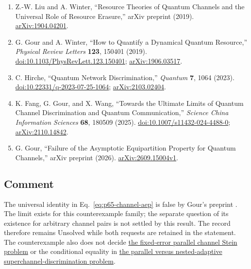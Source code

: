 \begin{enumerate}[label={},leftmargin=4.8em,labelsep=0.5em]
  \footnotesize
  \item[\textup{[LW19]}]\label{ref:p65-liu-winter}
  Z.-W. Liu and A. Winter,
  ``Resource Theories of Quantum Channels and the Universal Role of Resource
  Erasure,'' arXiv preprint (2019).
  \href{https://arxiv.org/abs/1904.04201}{arXiv:1904.04201}.

  \item[\textup{[GW19]}]\label{ref:p65-gour-winter}
  G. Gour and A. Winter, ``How to Quantify a Dynamical Quantum Resource,''
  \emph{Physical Review Letters} \textbf{123}, 150401 (2019).
  \href{https://doi.org/10.1103/PhysRevLett.123.150401}{doi:10.1103/PhysRevLett.123.150401};
  \href{https://arxiv.org/abs/1906.03517}{arXiv:1906.03517}.

  \item[\textup{[Hir23]}]\label{ref:p65-hirche}
  C. Hirche, ``Quantum Network Discrimination,''
  \emph{Quantum} \textbf{7}, 1064 (2023).
  \href{https://doi.org/10.22331/q-2023-07-25-1064}{doi:10.22331/q-2023-07-25-1064};
  \href{https://arxiv.org/abs/2103.02404}{arXiv:2103.02404}.

  \item[\textup{[FGW25]}]\label{ref:p65-fang-gour-wang}
  K. Fang, G. Gour, and X. Wang,
  ``Towards the Ultimate Limits of Quantum Channel Discrimination and Quantum
  Communication,'' \emph{Science China Information Sciences} \textbf{68},
  180509 (2025).
  \href{https://doi.org/10.1007/s11432-024-4488-0}{doi:10.1007/s11432-024-4488-0};
  \href{https://arxiv.org/abs/2110.14842}{arXiv:2110.14842}.

  \item[\textup{[Gou26]}]\label{ref:p65-gour-aep}
  G. Gour, ``Failure of the Asymptotic Equipartition Property for Quantum
  Channels,'' arXiv preprint (2026).
  \href{https://arxiv.org/abs/2609.15004v1}{arXiv:2609.15004v1}.
\end{enumerate}

\subsection*{Comment}

The universal identity in Eq.~\eqref{eq:p65-channel-aep} is false by
Gour's preprint .  The limit exists for
this counterexample family; the separate question of its existence for
arbitrary channel pairs is not settled by this result.  The record therefore
remains Unsolved while both requests are retained in the statement.  The
counterexample also does not decide
\href{https://qiqc-op.com/problem/op_08387c140f552732/}{the fixed-error parallel channel Stein problem}
or the conditional equality in
\href{https://qiqc-op.com/problem/op_a4600b38b94042a8/}{the parallel versus nested-adaptive superchannel-discrimination problem}.

